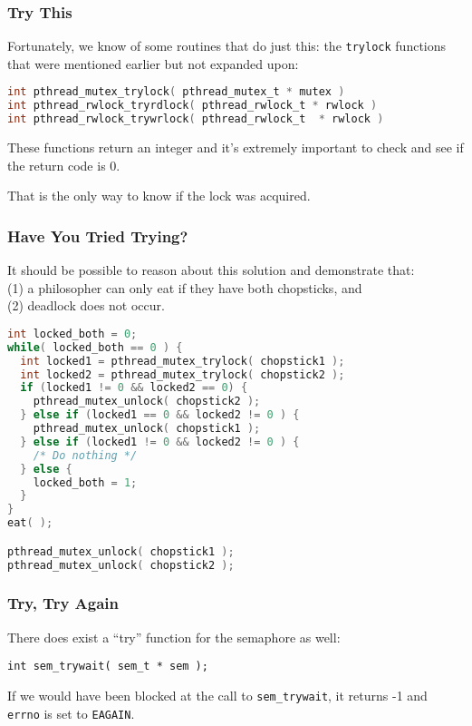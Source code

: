 \begin{frame}[fragile]
	\frametitle{Try This}
	Fortunately, we know of some routines that do just this: the \texttt{trylock} functions that were mentioned earlier but not expanded upon:
	\begin{lstlisting}[language=C]
int pthread_mutex_trylock( pthread_mutex_t * mutex )
int pthread_rwlock_tryrdlock( pthread_rwlock_t * rwlock )
int pthread_rwlock_trywrlock( pthread_rwlock_t  * rwlock )
\end{lstlisting}

	These functions return an integer and it's extremely important to check and see if the return code is 0.

	That is the only way to know if the lock was acquired.

\end{frame}


\begin{frame}[fragile]
	\frametitle{Have You Tried Trying?}

	It should be possible to reason about this solution and demonstrate that:\\
	\quad (1) a philosopher can only eat if they have both chopsticks, and\\
	\quad (2) deadlock does not occur.

	\begin{lstlisting}[language=C]
int locked_both = 0;
while( locked_both == 0 ) {
  int locked1 = pthread_mutex_trylock( chopstick1 );
  int locked2 = pthread_mutex_trylock( chopstick2 );
  if (locked1 != 0 && locked2 == 0) {
    pthread_mutex_unlock( chopstick2 );
  } else if (locked1 == 0 && locked2 != 0 ) {
    pthread_mutex_unlock( chopstick1 );
  } else if (locked1 != 0 && locked2 != 0 ) {
    /* Do nothing */
  } else {
    locked_both = 1;
  }
}
eat( );

pthread_mutex_unlock( chopstick1 );
pthread_mutex_unlock( chopstick2 );
\end{lstlisting}

\end{frame}

\begin{frame}[fragile]
\frametitle{Try, Try Again}

There does exist a ``try'' function for the semaphore as well:

\begin{lstlisting}
int sem_trywait( sem_t * sem );
\end{lstlisting}

If we would have been blocked at the call to \texttt{sem\_trywait}, it returns -1 and \texttt{errno} is set to \texttt{EAGAIN}.

\end{frame}



